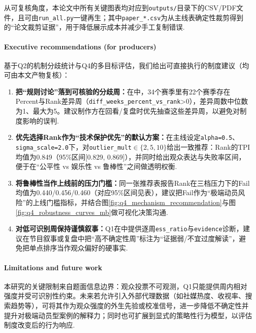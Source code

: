 从可复核角度，本论文中所有关键图表均对应到\texttt{outputs/}目录下的CSV/PDF文件，且可由\texttt{run\_all.py}一键再生；其中\texttt{paper\_*.csv}为从主线表确定性裁剪得到的“论文裁剪证据”，用于降低展示成本并减少手工复制错误.

\paragraph{Executive recommendations (for producers)}
基于Q2的机制分歧统计与Q4的多目标评估，我们给出可直接执行的制度建议（均可由本文产物复核）：
\begin{enumerate}[label=(\arabic*),leftmargin=2.4em]
    \item \textbf{把“规则讨论”落到可核验的分歧周：}在中，34个赛季里有22个赛季存在Percent与Rank差异周（\texttt{diff\_weeks\_percent\_vs\_rank}>0），差异周数中位数为1、最大为5。建议制作方在回看/复盘时优先抽查这些差异周，以避免对制度影响的误判.
    \item \textbf{优先选择Rank作为“技术保护优先”的默认方案：}在主线设定\texttt{alpha=0.5}、\texttt{sigma\_scale=2.0}下，对\texttt{outlier\_mult}$\in\{2,5,10\}$给出一致推荐：Rank的TPI均值为0.849（95\%区间[0.829, 0.869]），并同时给出观众表达与失败率区间，便于在“公平性 vs 娱乐性 vs 鲁棒性”之间做透明权衡.
    \item \textbf{将鲁棒性当作上线前的压力门槛：}同一张推荐表报告Rank在三档压力下的Fail均值为0.440/0.456/0.460（对应95\%区间见表），建议把Fail作为“极端动员风险”的上线门槛指标，并结合图\ref{fig:q4_mechanism_recommendation}与图\ref{fig:q4_robustness_curves_mb}做可视化决策沟通.
    \item \textbf{对低可识别周保持谨慎叙事：}Q1在中提供逐周\texttt{ess\_ratio}与\texttt{evidence}诊断，建议在节目叙事或复盘中把“高不确定性周”标注为“证据弱/不宜过度解读”，避免把单点排序当作观众偏好的硬事实.
\end{enumerate}

\paragraph{Limitations and future work}
本研究的关键限制来自题面信息边界：观众投票不可观测，Q1只能提供周内相对强度并受可识别性约束。未来若允许引入外部代理数据（如社媒热度、收视率、搜索趋势等），可将其作为观众强度的外生先验或校准信号，进一步降低不确定性并提升对极端动员型案例的解释力；同时也可扩展到显式的策略性行为模型，以评估制度改变后的行为响应.